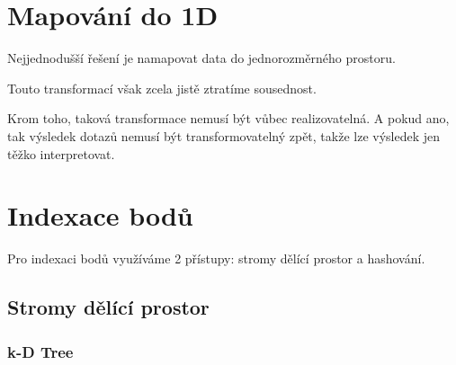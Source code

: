\section{Mapování do 1D}

\begin{compactitem}
    \item Nejjednodušší řešení je namapovat data do jednorozměrného prostoru.
    \item Touto transformací však zcela jistě ztratíme sousednost.
    \item Krom toho, taková transformace nemusí být vůbec realizovatelná. A pokud ano, tak výsledek dotazů nemusí být transformovatelný zpět, takže lze výsledek jen těžko interpretovat.
\end{compactitem}


\section{Indexace bodů}

\begin{compactitem}
    \item Pro indexaci bodů využíváme 2 přístupy: stromy dělící prostor a hashování.
\end{compactitem}

\subsection{Stromy dělící prostor}

\subsubsection{k-D Tree}

